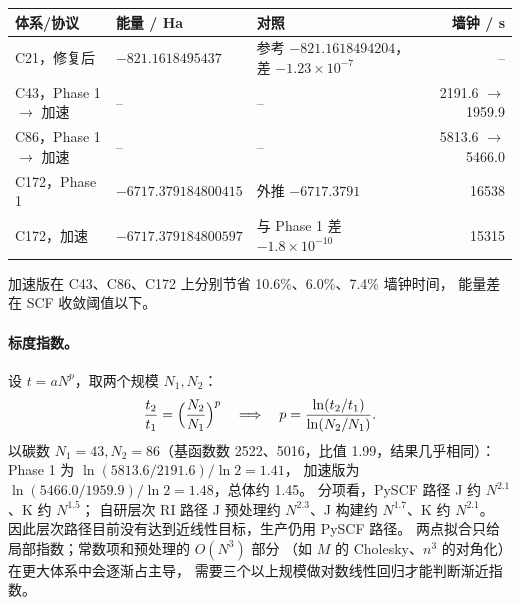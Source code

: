 \documentclass[UTF8,fontset=fandol,11pt,a4paper]{ctexart}
\numberwithin{equation}{section}
\begin{document}
\begin{center}
\small
\begin{tabular}{p{3.1cm}p{3.6cm}p{5.2cm}r}
\toprule
体系/协议 & 能量 / Ha & 对照 & 墙钟 / s\\
\midrule
C21，修复后 & \(-821.1618495437\) & 参考 \(-821.1618494204\)，差 \(-1.23\times10^{-7}\) & --\\
C43，Phase 1 \(\to\) 加速 & -- & -- & 2191.6 \(\to\) 1959.9\\
C86，Phase 1 \(\to\) 加速 & -- & -- & 5813.6 \(\to\) 5466.0\\
C172，Phase 1 & \(-6717.379184800415\) & 外推 \(-6717.3791\) & 16538\\
C172，加速 & \(-6717.379184800597\) & 与 Phase 1 差 \(-1.8\times10^{-10}\) & 15315\\
\bottomrule
\end{tabular}
\end{center}
加速版在 C43、C86、C172 上分别节省 10.6\%、6.0\%、7.4\% 墙钟时间，
能量差在 SCF 收敛阈值以下。

\paragraph{标度指数。}
设 \(t=aN^p\)，取两个规模 \(N_1,N_2\)：
\begin{equation}
\frac{t_2}{t_1}=\Bigl(\frac{N_2}{N_1}\Bigr)^p
\quad\Longrightarrow\quad
p=\frac{\ln(t_2/t_1)}{\ln(N_2/N_1)} .
\end{equation}
以碳数 \(N_1=43,N_2=86\)（基函数数 2522、5016，比值 1.99，结果几乎相同）：
Phase 1 为 \(\ln(5813.6/2191.6)/\ln2=1.41\)，
加速版为 \(\ln(5466.0/1959.9)/\ln2=1.48\)，总体约 1.45。
分项看，PySCF 路径 J 约 \(N^{2.1}\)、K 约 \(N^{1.5}\)；
自研层次 RI 路径 J 预处理约 \(N^{2.3}\)、J 构建约 \(N^{1.7}\)、K 约 \(N^{2.1}\)。
因此层次路径目前没有达到近线性目标，生产仍用 PySCF 路径。
两点拟合只给局部指数；常数项和预处理的 \(O(N^3)\) 部分
（如 \(M\) 的 Cholesky、\(n^3\) 的对角化）在更大体系中会逐渐占主导，
需要三个以上规模做对数线性回归才能判断渐近指数。

\appendix
\end{document}
